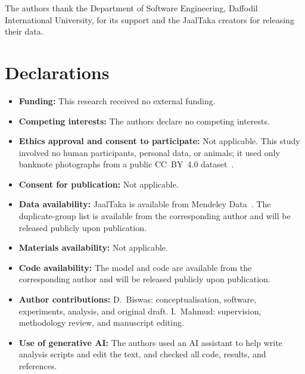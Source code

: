 \documentclass[pdflatex,iicol,sn-mathphys-num]{sn-jnl}
\begin{document}
\backmatter

The authors thank the Department of Software Engineering, Daffodil International
University, for its support and the JaalTaka creators for releasing their data.

\section*{Declarations}

\begin{itemize}
\item \textbf{Funding:} This research received no external funding.
\item \textbf{Competing interests:} The authors declare no competing interests.
\item \textbf{Ethics approval and consent to participate:} Not applicable. This study
involved no human participants, personal data, or animals; it used only banknote
photographs from a public CC~BY~4.0 dataset~\cite{jaaltaka_data}.
\item \textbf{Consent for publication:} Not applicable.
\item \textbf{Data availability:} JaalTaka is available from Mendeley
Data~\cite{jaaltaka_data}. The duplicate-group list is available from the corresponding
author and will be released publicly upon publication.
\item \textbf{Materials availability:} Not applicable.
\item \textbf{Code availability:} The model and code are available from the
corresponding author and will be released publicly upon publication.
\item \textbf{Author contributions:} D.~Biswas: conceptualisation, software,
experiments, analysis, and original draft. I.~Mahmud: supervision, methodology review,
and manuscript editing.
\item \textbf{Use of generative AI:} The authors used an AI assistant to help write
analysis scripts and edit the text, and checked all code, results, and references.
\end{itemize}


\end{document}
